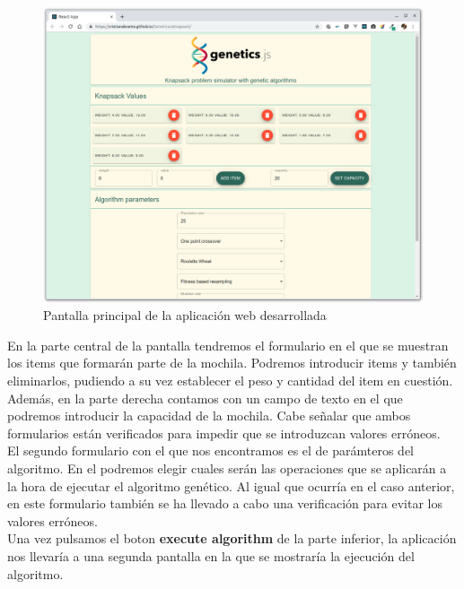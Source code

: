 \begin{figure}[H]
    \centering
    \includegraphics[scale=0.2]{mem/images/cap-5/knapsack-1.png}
    \caption{Pantalla principal de la aplicación web desarrollada}
    \label{fig:screenshot-1}
\end{figure}

En la parte central de la pantalla tendremos el formulario en el que se muestran los items que formarán parte de la mochila. Podremos introducir items y también eliminarlos, pudiendo a su vez establecer el peso y cantidad del item en cuestión. Además, en la parte derecha contamos con un campo de texto en el que podremos introducir la capacidad de la mochila. Cabe señalar que ambos formularios están verificados para impedir que se introduzcan valores erróneos. \\

El segundo formulario con el que nos encontramos es el de parámteros del algoritmo. En el podremos elegir cuales serán las operaciones que se aplicarán a la hora de ejecutar el algoritmo genético. Al igual que ocurría en el caso anterior, en este formulario también se ha llevado a cabo una verificación para evitar los valores erróneos. \\

Una vez pulsamos el boton \textbf{execute algorithm} de la parte inferior, la aplicación nos llevaría a una segunda pantalla en la que se mostraría la ejecución del algoritmo.

